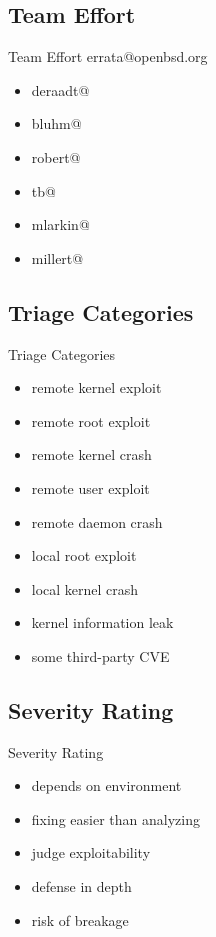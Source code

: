 \documentclass[14pt,aspectratio=169]{beamer}
\begin{document}
\subsection{Team Effort}
\begin{frame}{Team Effort}
errata@openbsd.org
\begin{itemize}
\item deraadt@
\item bluhm@
\item robert@
\item tb@
\item mlarkin@
\item millert@
\end{itemize}
\end{frame}

\subsection{Triage Categories}
\begin{frame}{Triage Categories}
\begin{itemize}
\item remote kernel exploit
\item remote root exploit
\item remote kernel crash
\item remote user exploit
\item remote daemon crash
\item local root exploit
\item local kernel crash
\item kernel information leak
\item some third-party CVE
\end{itemize}
\end{frame}

\subsection{Severity Rating}
\begin{frame}{Severity Rating}
\begin{itemize}
\item depends on environment
\item fixing easier than analyzing
\item judge exploitability
\item defense in depth
\item risk of breakage
\end{itemize}
\end{frame}
\end{document}
